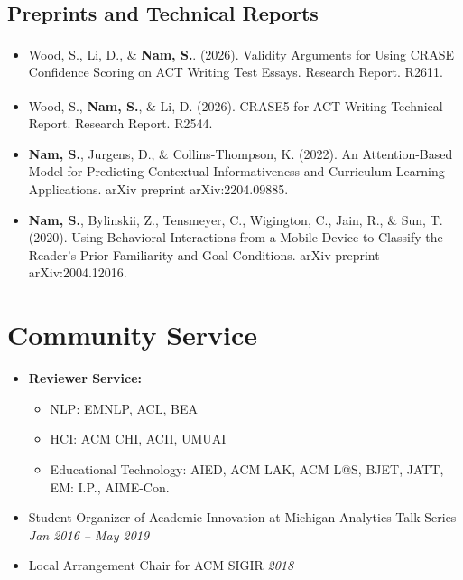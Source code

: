 \documentclass[11pt,a4paper]{article}
\begin{document}
\subsection*{Preprints and Technical Reports}
\begin{itemize}
    \item Wood, S., Li, D., \& \textbf{Nam, S.}. (2026). Validity Arguments for Using CRASE\textsuperscript{\textregistered} Confidence Scoring on ACT Writing Test Essays. Research Report. R2611.
    \item Wood, S., \textbf{Nam, S.}, \& Li, D. (2026). CRASE5\textsuperscript{\textregistered} for ACT Writing Technical Report. Research Report. R2544.
    \item \textbf{Nam, S.}, Jurgens, D., \& Collins-Thompson, K. (2022). An Attention-Based Model for Predicting Contextual Informativeness and Curriculum Learning Applications. arXiv preprint arXiv:2204.09885.
    \item \textbf{Nam, S.}, Bylinskii, Z., Tensmeyer, C., Wigington, C., Jain, R., \& Sun, T. (2020). Using Behavioral Interactions from a Mobile Device to Classify the Reader's Prior Familiarity and Goal Conditions. arXiv preprint arXiv:2004.12016.
\end{itemize}

\section*{Community Service}
\begin{itemize}
    \item \textbf{Reviewer Service:}
    \begin{itemize}
        \item NLP: EMNLP, ACL, BEA
        \item HCI: ACM CHI, ACII, UMUAI
        \item Educational Technology: AIED, ACM LAK, ACM L@S, BJET, JATT, EM: I.P., AIME-Con.
    \end{itemize}
    \item Student Organizer of Academic Innovation at Michigan Analytics Talk Series \hfill \textit{Jan 2016 -- May 2019}
    \item Local Arrangement Chair for ACM SIGIR \hfill \textit{2018}
\end{itemize}
\end{document}
